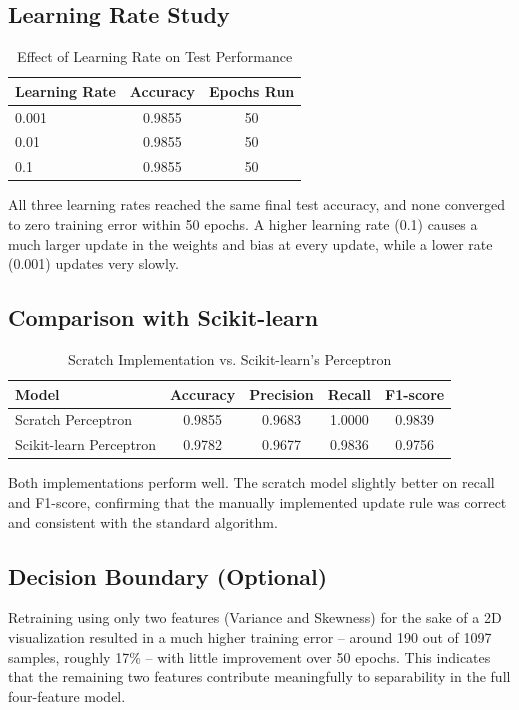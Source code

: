 \documentclass[11pt]{article}
\begin{document}
\subsection*{Learning Rate Study}

\begin{table}[H]
\centering
\caption{Effect of Learning Rate on Test Performance}
\begin{tabular}{lcc}
\toprule
Learning Rate & Accuracy & Epochs Run \\
\midrule
0.001 & 0.9855 & 50 \\
0.01  & 0.9855 & 50 \\
0.1   & 0.9855 & 50 \\
\bottomrule
\end{tabular}
\end{table}

All three learning rates reached the same final test accuracy, and none converged to zero training error within 50 epochs. A higher learning rate (0.1) causes a much larger update in the weights and bias at every update, while a lower rate (0.001) updates very slowly.

\subsection*{Comparison with Scikit-learn}

\begin{table}[H]
\centering
\caption{Scratch Implementation vs. Scikit-learn's Perceptron}
\begin{tabular}{lcccc}
\toprule
Model & Accuracy & Precision & Recall & F1-score \\
\midrule
Scratch Perceptron & 0.9855 & 0.9683 & 1.0000 & 0.9839 \\
Scikit-learn Perceptron & 0.9782 & 0.9677 & 0.9836 & 0.9756 \\
\bottomrule
\end{tabular}
\end{table}

Both implementations perform well. The scratch model slightly better on recall and F1-score, confirming that the manually implemented update rule was correct and consistent with the standard algorithm.

\subsection*{Decision Boundary (Optional)}

Retraining using only two features (Variance and Skewness) for the sake of a 2D visualization resulted in a much higher training error -- around 190 out of 1097 samples, roughly 17\% -- with little improvement over 50 epochs. This indicates that the remaining two features contribute meaningfully to separability in the full four-feature model.
\end{document}
